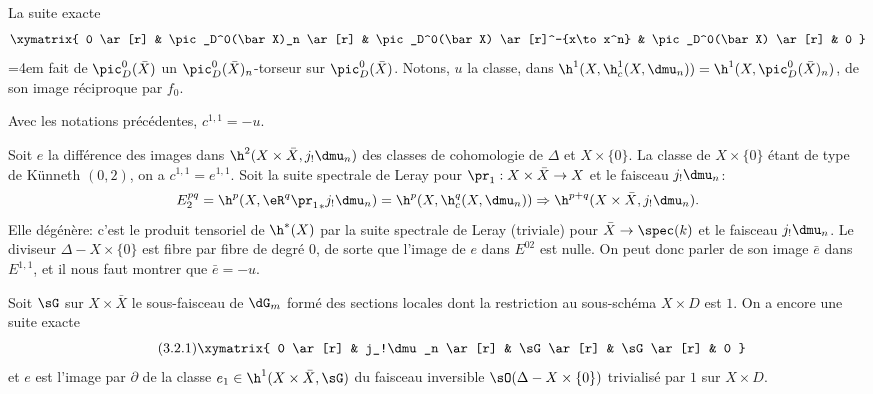 La suite exacte 
\[\xymatrix{
  0 \ar[r] 
    & \pic_D^0(\bar X)_n \ar[r] 
    & \pic_D^0(\bar X) \ar[r]^-{x\to x^n} 
    & \pic_D^0(\bar X) \ar[r] 
    & 0 
}\]
\begingroup
\emergencystretch=4em\relax
fait de $\pic_D^0(\bar X)$ un $\pic_D^0(\bar X)_n$-torseur sur 
$\pic_D^0(\bar X)$. Notons, $u$ la classe, dans 
$\h^1(X,\h_c^1(X,\dmu_n))=\h^1(X,\pic_D^0(\bar X)_n)$, de son image 
réciproque par $f_0$.\par
\endgroup 





\begin{proposition_}\label{V:3-2}
Avec les notations précédentes, $c^{1,1}=-u$.
\end{proposition_}

Soit $e$ la différence des images dans $\h^2(X\times \bar X,j_!\dmu_n)$ des 
classes de cohomologie de $\Delta$ et $X\times\{0\}$. La classe de $X\times\{0\}$ étant de type de 
K\"unneth $(0,2)$, on a $c^{1,1}=e^{1,1}$. Soit la suite spectrale de Leray 
pour $\pr_1:X\times \bar X\to X$ et le faisceau $j_!\dmu_n$: 
\[
  E_2^{pq} = \h^p(X,\eR^q {\pr_1}_\ast j_!\dmu_n) = \h^p(X,\h_c^q(X,\dmu_n)) \Rightarrow \h^{p+q}(X\times \bar X,j_!\dmu_n) \text{.}
\]
Elle dégénère: c'est le produit tensoriel de $\h^*(X)$ par la 
suite spectrale de Leray (triviale) pour $\bar X\to \spec(k)$ et le faisceau 
$j_!\dmu_n$. Le diviseur $\Delta-X\times\{0\}$ est fibre par fibre de degré 
$0$, de sorte que l'image de $e$ dans $E^{02}$ est nulle. On peut donc parler 
de son image $\bar e$ dans $E^{1,1}$, et il nous faut montrer que 
$\bar e = -u$. 

Soit $\sG$ sur $X\times\bar X$ le sous-faisceau de $\dG_m$ formé des sections 
locales dont la restriction au sous-schéma $X\times D$ est $1$. On a encore 
une suite exacte 
\begin{equation*}\tag{3.2.1}\label{V:eq:3-2-1}
\xymatrix{
  0 \ar[r] 
    & j_!\dmu_n \ar[r] 
    & \sG \ar[r] 
    & \sG \ar[r] 
    & 0 
}
\end{equation*}
et $e$ est l'image par $\partial$ de la classe $e_1\in \h^1(X\times\bar X,\sG)$ 
du faisceau inversible $\sO(\Delta-X\times\{0\})$ trivialisé par $1$ sur 
$X\times D$. 


